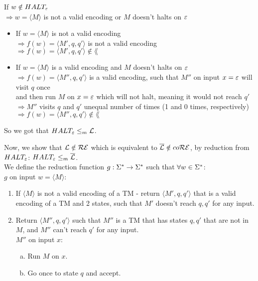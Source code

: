 If $w \notin HALT_\varepsilon$ \\
$\Longrightarrow w = \langle M \rangle$ is not a valid encoding or $M$ doesn't halts on $\varepsilon$
\begin{itemize}
        \item If $w = \langle M \rangle$ is not a valid encoding \\
              $\Longrightarrow f(w) = \langle M', q, q' \rangle$ is not a valid encoding  \\
              $\Longrightarrow f(w) = \langle M', q, q' \rangle \notin \lang$

        \item If $w = \langle M \rangle$ is a valid encoding and $M$ doesn't halts on $\varepsilon$ \\
              $\Longrightarrow f(w) = \langle M'', q, q' \rangle$ is a valid encoding, such that $M''$ on input $x = \varepsilon$ will visit $q$ once  \\
              and then run $M$ on $x = \varepsilon$ which will not halt, meaning it would not reach $q'$  \\
              $\Longrightarrow M''$ visits $q$ and $q'$ unequal number of times (1 and 0 times, respectively)  \\
              $\Longrightarrow f(w) = \langle M'', q, q' \rangle \notin \lang$
\end{itemize}

So we got that \underline{$HALT_\varepsilon \leq_m \mathcal{L}$}. \pagebreak

Now, we show that $\mathcal{L} \notin \mathcal{R}\mathcal{E}$ which is equivalent to $\overline{\mathcal{L}} \notin co\mathcal{R}\mathcal{E}$,
by reduction from $HALT_\varepsilon$: $HALT_\varepsilon \leq_m \overline{\mathcal{L}}$. \\

We define the reduction function $g: \Sigma^* \rightarrow \Sigma^*$ such that $\forall w \in \Sigma^*$:\\
$g$ on input $w = \langle M \rangle$:
\begin{enumerate}[1., itemsep=5pt]

        \item If $\langle M \rangle$ is not a valid encoding of a TM - return $\langle M', q, q' \rangle$
              that is a valid encoding of a TM and 2 states, such that $M'$ doesn't reach $q, q'$ for any input.

        \item Return $\langle M'', q, q' \rangle$ such that $M''$ is a TM that has states $q, q'$
              that are not in $M$, and $M''$ can't reach $q'$ for any input. \\
              \qquad $M''$ on input $x$:

              \begin{enumerate}[a., itemsep=5pt]
                      \item Run $M$ on $x$.
                      \item Go once to state $q$ and accept.
              \end{enumerate}

\end{enumerate}

